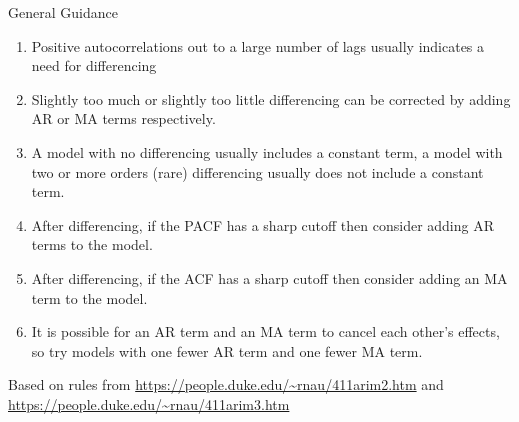 \documentclass[11pt,ignorenonframetext,]{beamer}
\begin{document}
\begin{frame}[t]{%
\protect\hypertarget{general-guidance}{%
General Guidance}}

\begin{enumerate}
[1.]
\item
  Positive autocorrelations out to a large number of lags usually
  indicates a need for differencing
\item
  Slightly too much or slightly too little differencing can be corrected
  by adding AR or MA terms respectively.
\item
  A model with no differencing usually includes a constant term, a model
  with two or more orders (rare) differencing usually does not include a
  constant term.
\item
  After differencing, if the PACF has a sharp cutoff then consider
  adding AR terms to the model.
\item
  After differencing, if the ACF has a sharp cutoff then consider adding
  an MA term to the model.
\item
  It is possible for an AR term and an MA term to cancel each other’s
  effects, so try models with one fewer AR term and one fewer MA term.
\end{enumerate}

\scriptsize{Based on rules from \url{https://people.duke.edu/~rnau/411arim2.htm} and \url{https://people.duke.edu/~rnau/411arim3.htm}}

\end{frame}
\end{document}
